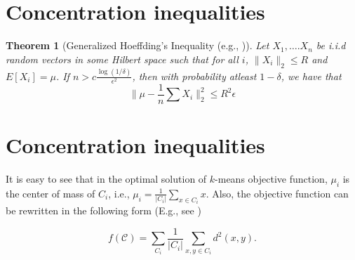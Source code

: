 \documentclass{article}
\newcommand{\mc}{\mathcal}
\newtheorem{theorem}{Theorem}
\begin{document}
\section{Concentration inequalities}
\label{appendixsection:conIneq}

\begin{theorem}[Generalized Hoeffding's Inequality (e.g., \cite{ashtiani2015dimension})]
\label{thm:genHoeff}
Let $X_1, \ldots. X_n$ be i.i.d random vectors in some Hilbert space such that for all $i$, $\|X_i\|_2 \le R$ and $E[X_i] = \mu$. If $n > c\frac{\log(1/\delta)}{\epsilon^2}$, then with probability atleast $1-\delta$, we have that
$$\Big\|\mu - \frac{1}{n}\sum X_i\Big\|_2^2 \le R^2\epsilon$$ 
\end{theorem}

\section{Concentration inequalities}
\label{appendixsection:proofs}

It is easy to see that in the optimal solution of $k$-means objective function, $\mu_i$ is the center of mass of $C_i$, i.e., $\mu_i = \frac{1}{|C_i|}\sum_{x\in C_i}x$. Also, the objective function can be rewritten in the following form (E.g., see \cite{inaba1994applications})

$$f(\mc C) = \sum\limits_{C_i}\frac{1}{|C_i|} \sum_{x, y \in C_i} d^2(x, y).$$
\end{document}
